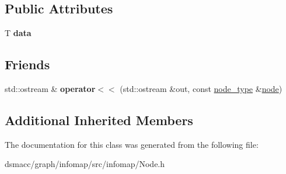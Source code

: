 \subsection*{Public Attributes}
\begin{DoxyCompactItemize}
\item 
\mbox{\label{classNode_ac450c71a8677a38d306361f9ced518d3}} 
T {\bfseries data}
\end{DoxyCompactItemize}
\subsection*{Friends}
\begin{DoxyCompactItemize}
\item 
\mbox{\label{classNode_adcab8ad07fc4a325f5697a520a051b7e}} 
std\+::ostream \& {\bfseries operator$<$$<$} (std\+::ostream \&out, const \mbox{\hyperlink{classNode}{node\+\_\+type}} \&\mbox{\hyperlink{structnode}{node}})
\end{DoxyCompactItemize}
\subsection*{Additional Inherited Members}


The documentation for this class was generated from the following file\+:\begin{DoxyCompactItemize}
\item 
dsmacc/graph/infomap/src/infomap/Node.\+h\end{DoxyCompactItemize}

